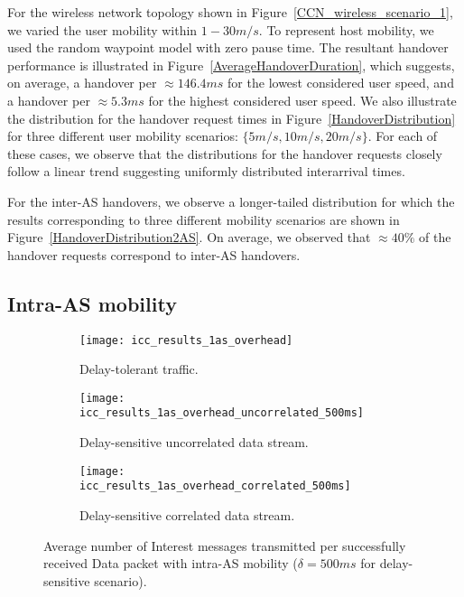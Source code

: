 \documentclass[conference]{IEEEtran}
\begin{document}
For the wireless network topology shown in Figure~\ref{CCN_wireless_scenario_1}, we varied the user mobility within $1-30m/s$.  To represent host mobility, we used the random waypoint model with zero pause time. The resultant handover performance is illustrated in Figure~\ref{AverageHandoverDuration}, which suggests, on average, a handover per $\approx 146.4ms$ for the lowest considered user speed, and a handover per $\approx 5.3ms$ for the highest considered user speed. We also illustrate the distribution for the handover request times in Figure~\ref{HandoverDistribution} for three different user mobility scenarios: $\{5m/s,10m/s,20m/s\}$. For each of these cases, we observe that the distributions for the handover requests closely follow a linear trend suggesting uniformly distributed interarrival times.


For the inter-AS handovers, we observe a longer-tailed distribution for which the results corresponding to three different mobility scenarios are shown in Figure~\ref{HandoverDistribution2AS}. On average, we observed that $\approx 40\%$ of the handover requests correspond to inter-AS handovers.


\subsection{Intra-AS mobility}




\begin{figure*}
        \centering
        \hspace{-0.15in}
          \begin{subfigure}[b]{0.3\textwidth}\centering
                \texttt{[image: icc\_results\_1as\_overhead]}\\
                \caption{Delay-tolerant traffic.}
                \label{DataOverhead}
        \end{subfigure}
        \hspace{0.05in}
        \begin{subfigure}[b]{0.3\textwidth}\centering
               \texttt{[image: icc\_results\_1as\_overhead\_uncorrelated\_500ms]}\\
               \caption{Delay-sensitive uncorrelated data stream.}
               \label{UncorrelatedOverhead}
        \end{subfigure}
        \hspace{0.05in}
        \begin{subfigure}[b]{0.3\textwidth}\centering
                \texttt{[image: icc\_results\_1as\_overhead\_correlated\_500ms]}\\
                \caption{Delay-sensitive correlated data stream.}
                \label{CorrelatedOverhead}
        \end{subfigure}
        \caption{Average number of Interest messages transmitted per successfully received Data packet with intra-AS mobility ($\delta=500ms$ for delay-sensitive scenario).}\label{fig:overhead}
\end{figure*}
\end{document}
